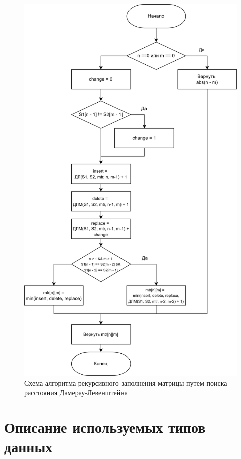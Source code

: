 \begin{figure}[h]
	\centering
	\includegraphics[height=0.8\textheight]{img/dlrechash-2.png}
	\caption{Схема алгоритма рекурсивного заполнения матрицы путем поиска расстояния Дамерау-Левенштейна}
	\label{fig:DLrechash2}
\end{figure}

\clearpage

\section{Описание используемых типов данных}

